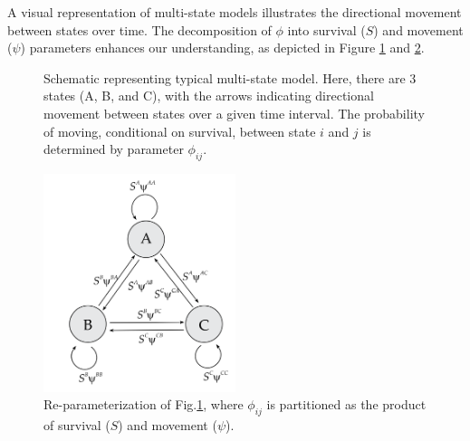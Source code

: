 \documentclass{article}
\begin{document}
A visual representation of multi-state models illustrates the directional movement between states over time. The decomposition of $\phi$ into survival ($S$) and movement ($\psi$) parameters enhances our understanding, as depicted in Figure \ref{fig:multi-state-model}  and \ref{fig:reparameterization}.
\begin{figure}[ht]
\centering
{}
\caption{Schematic representing typical multi-state model. Here, there are 3 states (A, B, and C), with the arrows indicating directional movement between states over a given time interval. The probability of moving, conditional on survival, between state \( i \) and \( j \) is determined by parameter \( \phi_{ij} \).\cite{mark_website}}
\label{fig:multi-state-model}
\end{figure}


\begin{figure}
    \centering
    \includegraphics[width=0.5\textwidth]{Picture1} 
    \caption{Re-parameterization of Fig.\ref{fig:multi-state-model}, where $\phi_{ij}$ is partitioned as the product of survival ($S$) and movement ($\psi$).\cite{mark_website}}
    \label{fig:reparameterization}
\end{figure}
\end{document}
